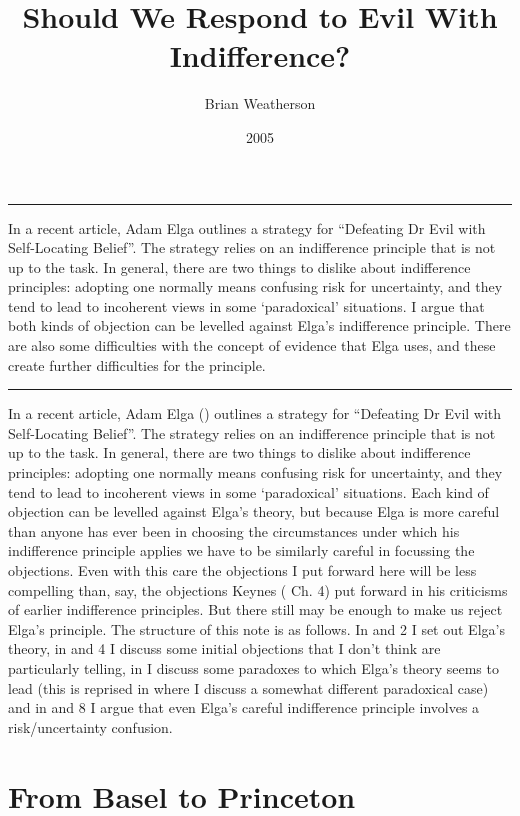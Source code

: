 \documentclass[
  10pt,
  letterpaper,
  DIV=11,
  numbers=noendperiod,
  twoside]{scrartcl}
\title{Should We Respond to Evil With Indifference?}
\author{Brian Weatherson}
\date{2005}
\renewenvironment{abstract}
 {\vspace{-1.25cm}
 \quotation\small\noindent\rule{\linewidth}{.5pt}\par\smallskip
 \noindent }
 {\par\noindent\rule{\linewidth}{.5pt}\endquotation}
\begin{document}
\maketitle
\begin{abstract}
In a recent article, Adam Elga outlines a strategy for ``Defeating Dr
Evil with Self-Locating Belief''. The strategy relies on an indifference
principle that is not up to the task. In general, there are two things
to dislike about indifference principles: adopting one normally means
confusing risk for uncertainty, and they tend to lead to incoherent
views in some `paradoxical' situations. I argue that both kinds of
objection can be levelled against Elga's indifference principle. There
are also some difficulties with the concept of evidence that Elga uses,
and these create further difficulties for the principle.
\end{abstract}

In a recent article, Adam Elga () outlines
a strategy for ``Defeating Dr Evil with Self-Locating Belief''. The
strategy relies on an indifference principle that is not up to the task.
In general, there are two things to dislike about indifference
principles: adopting one normally means confusing risk for uncertainty,
and they tend to lead to incoherent views in some `paradoxical'
situations. Each kind of objection can be levelled against Elga's
theory, but because Elga is more careful than anyone has ever been in
choosing the circumstances under which his indifference principle
applies we have to be similarly careful in focussing the objections.
Even with this care the objections I put forward here will be less
compelling than, say, the objections Keynes
( Ch. 4) put forward in his criticisms of
earlier indifference principles. But there still may be enough to make
us reject Elga's principle. The structure of this note is as follows. In
and 2 I set out Elga's theory, in and 4 I discuss some initial
objections that I don't think are particularly telling, in I discuss
some paradoxes to which Elga's theory seems to lead (this is reprised in
where I discuss a somewhat different paradoxical case) and in and 8 I
argue that even Elga's careful indifference principle involves a
risk/uncertainty confusion.

\section{From Basel to Princeton}\label{sec-basel}
\end{document}
